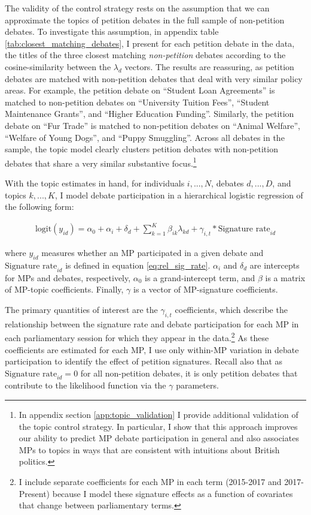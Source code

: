 \documentclass[12pt]{article}
\begin{document}
The validity of the control strategy rests on the assumption that we can approximate the topics of petition debates in the full sample of non-petition debates. To investigate this assumption, in appendix table \ref{tab:closest_matching_debates}, I present for each petition debate in the data, the titles of the three closest matching \emph{non-petition} debates according to the cosine-similarity between the $\lambda_d$ vectors. The results are reassuring, as petition debates are matched with non-petition debates that deal with very similar policy areas. For example, the petition debate on ``Student Loan Agreements'' is matched to non-petition debates on ``University Tuition Fees'', ``Student Maintenance Grants'', and ``Higher Education Funding''. Similarly, the petition debate on ``Fur Trade'' is matched to non-petition debates on ``Animal Welfare'', ``Welfare of Young Dogs'', and ``Puppy Smuggling''. Across all debates in the sample, the topic model clearly clusters petition debates with non-petition debates that share a very similar substantive focus.\footnote{In appendix section \ref{app:topic_validation} I provide additional validation of the topic control strategy. In particular, I show that this approach improves our ability to predict MP debate participation in general and also associates MPs to topics in ways that are consistent with intuitions about British politics.}

With the topic estimates in hand, for individuals $i,...,N$, debates $d,...,D$, and topics $k,...,K$, I model debate participation in a hierarchical logistic regression of the following form:

\vspace{-0.5cm}
\begin{eqnarray}\label{eq:model}
\text{logit}(y_{id}) =  \alpha_0 + \alpha_{i} + \delta_{d} + \sum_{k=1}^{K}\beta_{ik}\lambda_{kd}  + \gamma_{i,t}  * \text{Signature rate}_{id}
\end{eqnarray}

\noindent where $y_{id}$ measures whether an MP participated in a given debate and $\text{Signature rate}_{id}$ is defined in equation \ref{eq:rel_sig_rate}. $\alpha_{i}$ and $\delta_{d}$ are intercepts for MPs and debates, respectively, $\alpha_{0}$ is a grand-intercept term, and $\beta$ is a matrix of MP-topic coefficients. Finally, $\gamma$ is a vector of MP-signature coefficients.

The primary quantities of interest are the $\gamma_{i,t}$ coefficients, which describe the relationship between the signature rate and debate participation for each MP in each parliamentary session for which they appear in the data.\footnote{I include separate coefficients for each MP in each term (2015-2017 and 2017-Present) because I model these signature effects as a function of covariates that change between parliamentary terms.} As these coefficients are estimated for each MP, I use only within-MP variation in debate participation to identify the effect of petition signatures. Recall also that as $\text{Signature rate}_{id} = 0$ for all non-petition debates, it is only petition debates that contribute to the likelihood function via the $\gamma$ parameters.  
\end{document}
